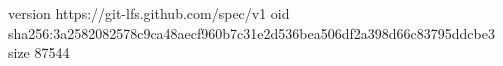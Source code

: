 version https://git-lfs.github.com/spec/v1
oid sha256:3a2582082578c9ca48aecf960b7c31e2d536bea506df2a398d66c83795ddcbe3
size 87544
